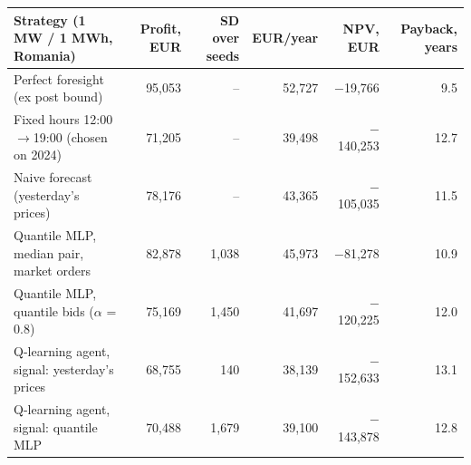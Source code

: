 \begin{tabular}{lrrrrr}
\toprule
Strategy (1 MW / 1 MWh, Romania) & Profit, EUR & SD over seeds & EUR/year & NPV, EUR & Payback, years \\
\midrule
Perfect foresight (ex post bound) & 95,053 & -- & 52,727 & $-$19,766 & 9.5 \\
Fixed hours 12:00$\rightarrow$19:00 (chosen on 2024) & 71,205 & -- & 39,498 & $-$140,253 & 12.7 \\
Naive forecast (yesterday's prices) & 78,176 & -- & 43,365 & $-$105,035 & 11.5 \\
Quantile MLP, median pair, market orders & 82,878 & 1,038 & 45,973 & $-$81,278 & 10.9 \\
Quantile MLP, quantile bids ($\alpha$ = 0.8) & 75,169 & 1,450 & 41,697 & $-$120,225 & 12.0 \\
Q-learning agent, signal: yesterday's prices & 68,755 & 140 & 38,139 & $-$152,633 & 13.1 \\
Q-learning agent, signal: quantile MLP & 70,488 & 1,679 & 39,100 & $-$143,878 & 12.8 \\
\bottomrule
\end{tabular}

